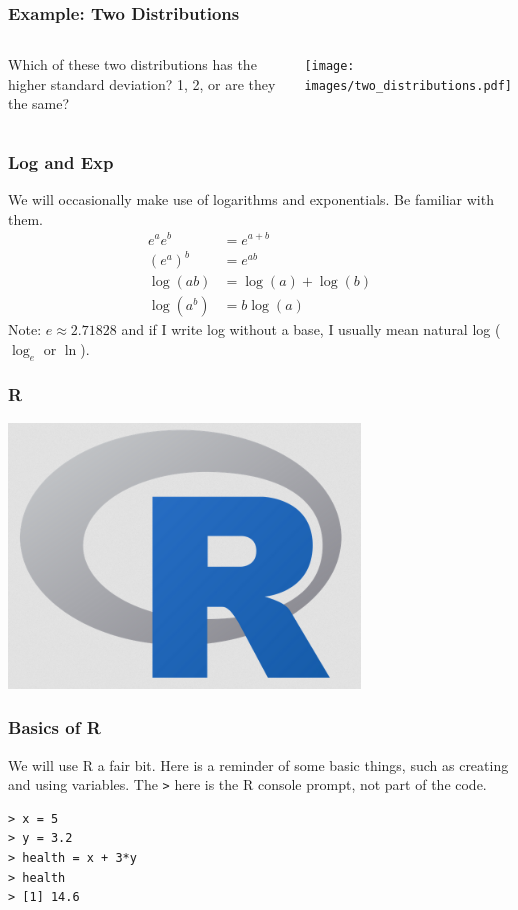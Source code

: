 \documentclass{beamer}
\begin{document}
\begin{frame}
\frametitle{Example: Two Distributions}

    \begin{columns} %
        Which of these two distributions has the higher
        standard deviation?
        1, 2, or are they the same?

        \texttt{[image: images/two\_distributions.pdf]}

     \end{columns}

\end{frame}

\begin{frame}
\frametitle{Log and Exp}
We will occasionally make use of logarithms and exponentials.
Be familiar with them.\pause
\begin{align}
e^a e^b &= e^{a+b} \\
(e^a)^b &= e^{ab} \\
\log(ab) &= \log(a) + \log(b) \\
\log(a^b) &= b \log(a)
\end{align}\pause
Note: $e \approx 2.71828$ and if I write log without a base, I usually mean
natural log ($\log_e$ or $\ln$).
\end{frame}

\begin{frame}
\frametitle{R}

\begin{center}
\includegraphics[width=0.7\textwidth]{images/Rlogo.png}
\end{center}


\end{frame}


\begin{frame}[fragile]
\frametitle{Basics of R}
We will use R a fair bit. Here is a reminder of some basic
things, such as creating and using variables. The \texttt{>}
here is the R console prompt, not part of the code.
\begin{verbatim}
> x = 5
> y = 3.2
> health = x + 3*y
> health
> [1] 14.6
\end{verbatim}

\end{frame}
\end{document}
